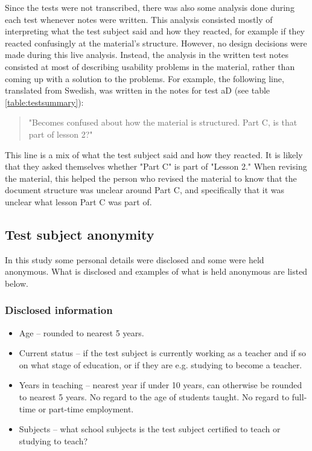 Since the tests were not transcribed, there was also some analysis done during each test whenever notes were written. This analysis consisted mostly of interpreting what the test subject said and how they reacted, for example if they reacted confusingly at the material's structure. However, no design decisions were made during this live analysis. Instead, the analysis in the written test notes consisted at most of describing usability problems in the material, rather than coming up with a solution to the problems. For example, the following line, translated from Swedish, was written in the notes for test aD (see table \ref{table:testsummary}):

\begin{quote}
  "Becomes confused about how the material is structured. Part C, is that part of lesson 2?"
\end{quote}

This line is a mix of what the test subject said and how they reacted. It is likely that they asked themselves whether "Part C" is part of "Lesson 2." When revising the material, this helped the person who revised the material to know that the document structure was unclear around Part C, and specifically that it was unclear what lesson Part C was part of.

\subsection{Test subject anonymity} \label{subjectanonymity}
In this study some personal details were disclosed and some were held anonymous. What is disclosed and examples of what is held anonymous are listed below.

\subsubsection*{Disclosed information}
    \begin{itemize} %
    \item Age – rounded to nearest 5 years.
    \item Current status – if the test subject is currently working as a teacher and if so on what stage of education, or if they are e.g. studying to become a teacher.
    \item Years in teaching – nearest year if under 10 years, can otherwise be rounded to nearest 5 years. No regard to the age of students taught. No regard to full-time or part-time employment.
    \item Subjects – what school subjects is the test subject certified to teach or studying to teach?
\end{itemize}

